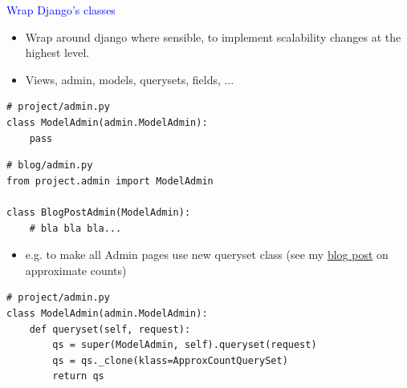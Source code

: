 \documentclass[landscape]{slides}
\begin{document}
\begin{slide}

    \textcolor{blue}{\Large{Wrap Django's classes}}

    \begin{itemize}
        \item Wrap around django where sensible, to implement scalability changes at the highest level.
        \item Views, admin, models, querysets, fields, ...
    \end{itemize}

    \begin{lstlisting}
# project/admin.py
class ModelAdmin(admin.ModelAdmin):
    pass
    \end{lstlisting}

    \begin{lstlisting}
# blog/admin.py
from project.admin import ModelAdmin

class BlogPostAdmin(ModelAdmin):
    # bla bla bla...
    \end{lstlisting}

\end{slide}


\begin{slide}

    \begin{itemize}
        \item e.g. to make all Admin pages use new queryset class (see my \href{http://adamj.eu/tech/2014/07/16/extending-djangos-queryset-to-return-approximate-counts/}{blog post} on approximate counts)
    \end{itemize}

    \begin{lstlisting}
# project/admin.py
class ModelAdmin(admin.ModelAdmin):
    def queryset(self, request):
        qs = super(ModelAdmin, self).queryset(request)
        qs = qs._clone(klass=ApproxCountQuerySet)
        return qs
    \end{lstlisting}

\end{slide}
\end{document}

